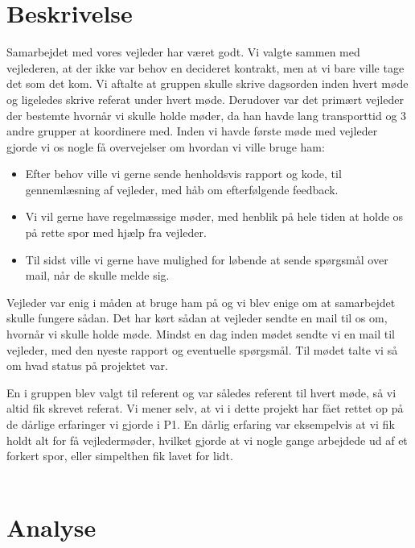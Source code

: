 \section{Beskrivelse}
Samarbejdet med vores vejleder har været godt. Vi valgte sammen med vejlederen, at der ikke var behov en decideret kontrakt, men at vi bare ville tage det som det kom. Vi aftalte at gruppen skulle skrive dagsorden inden hvert møde og ligeledes skrive referat under hvert møde. Derudover var det primært vejleder der bestemte hvornår vi skulle holde møder, da han havde lang transporttid og 3 andre grupper at koordinere med. Inden vi havde første møde med vejleder gjorde vi os nogle få overvejelser om hvordan vi ville bruge ham:
\begin{itemize}
\item	Efter behov ville vi gerne sende henholdsvis rapport og kode, til gennemlæsning af vejleder, med håb om efterfølgende feedback.

\item	Vi vil gerne have regelmæssige møder, med henblik på hele tiden at holde os på rette spor med hjælp fra vejleder.

\item Til sidst ville vi gerne have mulighed for løbende at sende spørgsmål over mail, når de skulle melde sig.
\end{itemize}
Vejleder var enig i måden at bruge ham på og vi blev enige om at samarbejdet skulle fungere sådan. Det har kørt sådan at vejleder sendte en mail til os om, hvornår vi skulle holde møde. Mindst en dag inden mødet sendte vi en mail til vejleder, med den nyeste rapport og eventuelle spørgsmål. Til mødet talte vi så om hvad status på projektet var. 

En i gruppen blev valgt til referent og var således referent til hvert møde, så vi altid fik skrevet referat. Vi mener selv, at vi i dette projekt har fået rettet op på de dårlige erfaringer vi gjorde i P1. En dårlig erfaring var eksempelvis at vi fik holdt alt for få vejledermøder, hvilket gjorde at vi nogle gange arbejdede ud af et forkert spor, eller simpelthen fik lavet for lidt. 
\\
\\

\section{Analyse}

